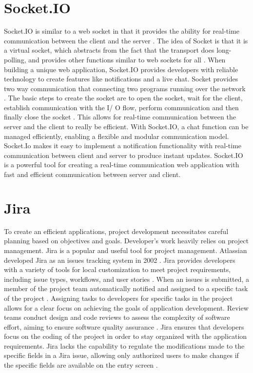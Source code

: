 \section{Socket.IO}
Socket.IO is similar to a web socket in that it provides the ability for real-time communication between the client and the server \cite{gelens2014gevent}. The idea of Socket is that it is a virtual socket, which abstracts from the fact that the transport does long-polling, and provides other functions similar to web sockets for all \cite{gelens2014gevent}. When building a unique web application, Socket.IO provides developers with reliable technology to create features like notifications and a live chat. Socket provides two way communication that connecting two programs running over the network \cite{joby2016socket}. The basic steps to create the socket are to open the socket, wait for the client, establish communication with the I/ O flow, perform communication and then finally close the socket \cite{joby2016socket}. This allows for real-time communication between the server and the client to really be efficient. With Socket.IO, a chat function can be managed efficiently,
enabling a flexible and modular communication model. Socket.Io makes it easy to implement a notification functionality with real-time communication between client and server to produce instant updates. Socket.IO is a powerful tool for creating a real-time communication web application with fast and efficient communication between server and client. 

\section{Jira}
To create an efficient applications, project development necessitates careful planning based on objectives and goals. Developer's work heavily relies on project management. Jira is a popular and useful tool for project management. Atlassian developed Jira as an issues tracking system in 2002 \cite{fisher2013utilizing}. Jira provides developers with a variety of tools for local customization to meet project requirements,
including issue types, workflows, and user stories \cite{fisher2013utilizing}. When an issues is submitted, a member of the project team automatically notified and assigned to a specific task of the project \cite{fisher2013utilizing}. Assigning tasks to developers for specific tasks in the project allows for a clear focus on achieving the goals of application development. Review teams conduct design and code reviews to assess the complexity of software effort, aiming to ensure software quality assurance \cite{fisher2013utilizing}. Jira ensures that developers focus on the coding of the project in order to stay organized with the application requirements. Jira lacks the capability to regulate the modifications made to the specific fields in a Jira issue, allowing only authorized users to make changes if the specific fields are available on the entry screen \cite{fisher2013utilizing}.

